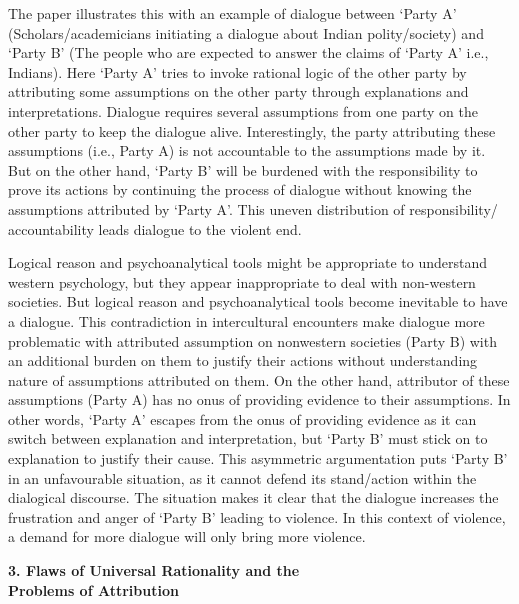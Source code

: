 \begin{multicols}{2}
\noi
The paper illustrates this with an example of dialogue between ‘Party A’ (Scholars/academicians
initiating a dialogue about Indian polity/society) and ‘Party B’ (The people who are expected to
answer the claims of ‘Party A’ i.e., Indians). Here ‘Party A’ tries to invoke rational logic of the
other party by attributing some assumptions on the other party through explanations and
interpretations. Dialogue requires several assumptions from one party on the other party to keep
the dialogue alive. Interestingly, the party attributing these assumptions (i.e., Party A) is not
accountable to the assumptions made by it. But on the other hand, ‘Party B’ will be burdened with
the responsibility to prove its actions by continuing the process of dialogue without knowing the
assumptions attributed by ‘Party A’. This uneven distribution of responsibility/ accountability
leads dialogue to the violent end.

\noi
Logical reason and psychoanalytical tools might be appropriate to understand western
psychology, but they appear inappropriate to deal with non-western societies. But logical reason
and psychoanalytical tools become inevitable to have a dialogue. This contradiction in
intercultural encounters make dialogue more problematic with attributed assumption on nonwestern societies (Party B) with an additional burden on them to justify their actions without
understanding nature of assumptions attributed on them. On the other hand, attributor of these
assumptions (Party A) has no onus of providing evidence to their assumptions. In other words,
‘Party A’ escapes from the onus of providing evidence as it can switch between explanation and
interpretation, but ‘Party B’ must stick on to explanation to justify their cause. This asymmetric
argumentation puts ‘Party B’ in an unfavourable situation, as it cannot defend its stand/action
within the dialogical discourse. The situation makes it clear that the dialogue increases the
frustration and anger of ‘Party B’ leading to violence. In this context of violence, a demand for
more dialogue will only bring more violence.

\noi
{\large \bfseries 3. Flaws of Universal Rationality and the\\ Problems of Attribution}


\end{multicols}
